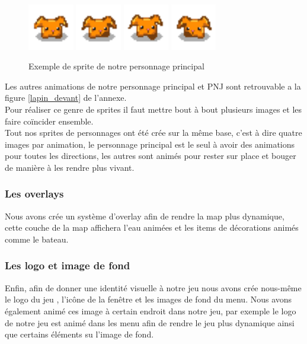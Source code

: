\documentclass{article}
\begin{document}
\begin{figure}[h]
    \centering
    \includegraphics[height = 2cm]{haricot/forward_0.png}
    \includegraphics[height = 2cm]{haricot/forward_1.png}
    \includegraphics[height = 2cm]{haricot/forward_2.png}
    \includegraphics[height = 2cm]{haricot/forward_3.png}
    \caption{Exemple de sprite de notre personnage principal}
\end{figure}
Les autres animations de notre personnage principal et PNJ sont retrouvable a la figure \ref{lapin_devant} de l'annexe.
\\
Pour réaliser ce genre de sprites il faut mettre bout à bout plusieurs images et les faire coïncider ensemble.\\
Tout nos sprites de personnages ont été crée sur la même base, c'est à dire quatre images par animation, le personnage principal est le seul à avoir des animations pour toutes les directions, les autres sont animés pour rester sur place et bouger de manière à les rendre plus vivant.
\\
\subsubsection{Les overlays}
Nous avons crée un système d'overlay afin de rendre la map plus dynamique, cette couche de la map affichera l'eau animées et les items de décorations animés comme le bateau.

\subsubsection{Les logo et image de fond}
Enfin, afin de donner une identité visuelle à notre jeu nous avons crée nous-même le logo du jeu , l'icône de la fenêtre et les images de fond du menu. Nous avons également animé ces image à certain endroit dans notre jeu, par exemple le logo de notre jeu est animé dans les menu afin de rendre le jeu plus dynamique ainsi que certains éléments su l'image de fond.
\end{document}
